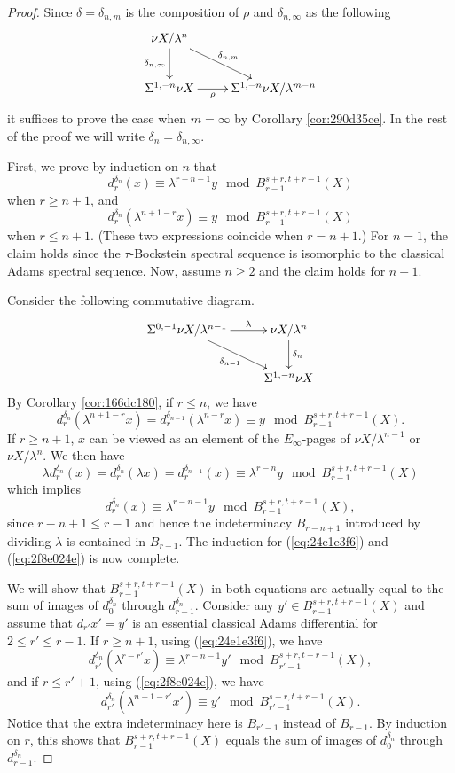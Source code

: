 \documentclass[12pt]{amsart}
\numberwithin{equation}{section}
\begin{document}
\begin{proof}
    Since $\delta=\delta_{n,m}$ is the composition of $\rho$ and $\delta_{n,\infty}$ as the following
     $$\xymatrix{
    \nu X/\lambda^n\ar[d]_-{\delta_{n,\infty}} \ar[rd]^{\delta_{n,m}} & \\
    \Sus^{1,-n}\nu X\ar[r]_-{\rho} & \Sus^{1,-n}\nu X/\lambda^{m-n}
    }$$
    it suffices to prove the case when $m=\infty$ by Corollary \ref{cor:290d35ce}. In the rest of the proof we will write $\delta_n=\delta_{n,\infty}$.

    First, we prove by induction on $n$ that
    \begin{equation}\label{eq:24e1e3f6}
        d^{\delta_n}_r(x)\equiv \lambda^{r-n-1}y\mod B_{r-1}^{s+r,t+r-1}(X)
    \end{equation}
    when $r\ge n+1$, and
    \begin{equation}\label{eq:2f8e024e}
        d^{\delta_n}_r(\lambda^{n+1-r}x)\equiv y\mod B_{r-1}^{s+r,t+r-1}(X)
    \end{equation}
    when $r\le n+1$. (These two expressions coincide when $r=n+1$.) For $n=1$, the claim holds since the $\tau$-Bockstein spectral sequence is isomorphic to the classical Adams spectral sequence. Now, assume $n\ge 2$ and the claim holds for $n-1$.

    Consider the following commutative diagram.
    $$\xymatrix{
        \Sus^{0,-1}\nu X/\lambda^{n-1} \ar[rd]_-{\delta_{n-1}} \ar[r]^-\lambda &  \nu X/\lambda^{n}\ar[d]^-{\delta_{n}}\\
        & \Sus^{1,-n}\nu X\\
    }$$
    By Corollary \ref{cor:166dc180}, if $r\le n$, we have
    $$d^{\delta_{n}}_r(\lambda^{n+1-r}x)=d^{\delta_{n-1}}_r(\lambda^{n-r}x)\equiv y\mod B_{r-1}^{s+r,t+r-1}(X).$$
    If $r\ge n+1$, $x$ can be viewed as an element of the $E_\infty$-pages of $\nu X/\lambda^{n-1}$ or $\nu X/\lambda^n$. We then have
    $$\lambda d^{\delta_{n}}_r(x)=d^{\delta_{n}}_r(\lambda x)=d^{\delta_{n-1}}_r(x)\equiv \lambda^{r-n}y \mod B_{r-1}^{s+r,t+r-1}(X)$$
    which implies
    $$d^{\delta_{n}}_r(x)\equiv\lambda^{r-n-1}y\mod B_{r-1}^{s+r,t+r-1}(X),$$
    since $r-n+1\le r-1$ and hence the indeterminacy $B_{r-n+1}$ introduced by dividing $\lambda$ is contained in $B_{r-1}$. The induction for (\ref{eq:24e1e3f6}) and (\ref{eq:2f8e024e}) is now complete.

    We will show that
    $B_{r-1}^{s+r,t+r-1}(X)$ in both equations are actually equal to the sum of images of $d^{\delta_{n}}_0$ through $d^{\delta_{n}}_{r-1}$.
    Consider any $y'\in B_{r-1}^{s+r,t+r-1}(X)$ and assume that $d_{r'}x'=y'$ is an essential classical Adams differential for $2\le r'\le r-1$. If $r\ge n+1$, using (\ref{eq:24e1e3f6}), we have
    $$d^{\delta_n}_{r'}(\lambda^{r-r'}x)\equiv \lambda^{r-n-1}y'\mod B_{r'-1}^{s+r,t+r-1}(X),$$
    and if $r\leq r'+1$, using (\ref{eq:2f8e024e}), we have
    $$d^{\delta_n}_{r'}(\lambda^{n+1-r'}x')\equiv y'\mod B_{r'-1}^{s+r,t+r-1}(X).$$
    Notice that the extra indeterminacy here is $B_{r'-1}$ instead of $B_{r-1}$. By induction on $r$, this shows that $B_{r-1}^{s+r,t+r-1}(X)$ equals the sum of images of $d^{\delta_{n}}_0$ through $d^{\delta_{n}}_{r-1}$.


\end{proof}
\end{document}
